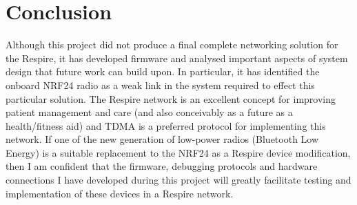 
\chapter{Conclusion}

Although this project did not produce a final complete networking solution for the Respire, it has
developed firmware and analysed important aspects of system design that future work can build
upon. In particular, it has identified the onboard \ac{NRF24} radio as a weak link in the system required
to effect this particular solution. The Respire network is an excellent concept for improving patient
management and care (and also conceivably as a future as a health/fitness aid) and \ac{TDMA} is a
preferred protocol for implementing this network. If one of the new generation of low-power radios
(\eg Bluetooth Low Energy) is a suitable replacement to the \ac{NRF24} as a Respire device
modification, then I am confident that the firmware, debugging protocols and hardware connections
I have developed during this project will greatly facilitate testing and implementation of these
devices in a Respire network.

